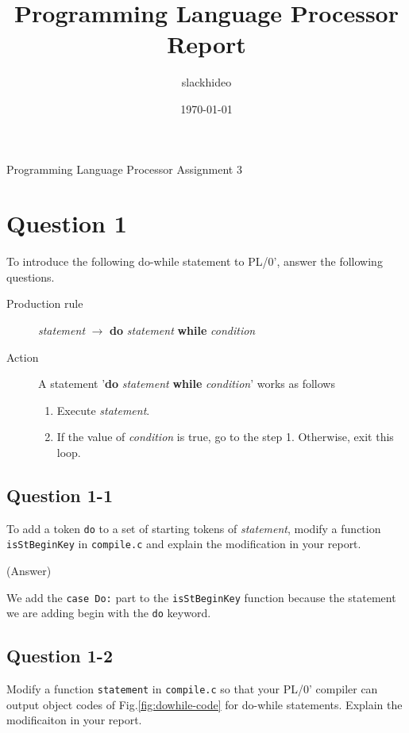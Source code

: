 \documentclass{article}
\title{Programming Language Processor \\ Report}
\author{slackhideo}
\date{\today}
\begin{document}
\ifreport
\maketitle
\else
\begin{center}
{\huge Programming Language Processor Assignment 3}
\end{center}
\fi


\section*{Question 1}

To introduce the following do-while statement to PL/0', answer the following questions.
\begin{description}
 \item[Production rule] {\it statement}  $\to$ {\bf do} {\it statement} {\bf while} {\it condition}
 \item[Action] A statement '{\bf do} {\it statement} {\bf while} {\it condition}' works as follows
	    \begin{enumerate}
	     \item Execute {\it statement}.
	     \item If the value of {\it condition} is true, go to the step 1. Otherwise, exit this loop.
	    \end{enumerate}
\end{description}

\subsection*{Question 1-1}
To add a token {\tt do} to a set of starting tokens of {\it statement},
modify a function {\tt isStBeginKey} in {\tt compile.c} and explain the modification in your report.

\ifreport
(Answer)\\
\fi

We add the {\tt case Do:} part to the {\tt isStBeginKey} function because the
statement we are adding begin with the {\tt do} keyword.


\subsection*{Question 1-2}
Modify a function {\tt statement} in {\tt compile.c} 
so that your PL/0' compiler can output object codes of Fig.\ref{fig:dowhile-code} for
do-while statements.
Explain the modificaiton in your report.
\end{document}
